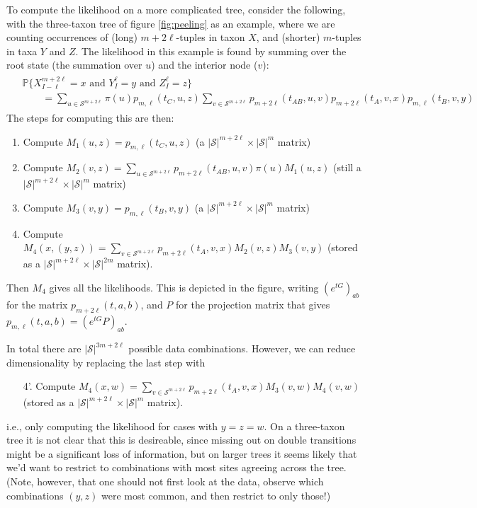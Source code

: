 \documentclass{article}
\renewcommand{\P}{\mathbb{P}}
\newcommand{\calS}{\mathcal{S}}  %
\theoremstyle{plain}
\theoremstyle{definition}
\begin{document}
To compute the likelihood on a more complicated tree, consider the following,
with the three-taxon tree of figure \ref{fig:peeling} as an example,
where we are counting occurrences of (long) $m+2\ell$-tuples in taxon $X$,
and (shorter) $m$-tuples in taxa $Y$ and $Z$.
The likelihood in this example is found by summing over the root state (the summation over $u$)
and the interior node ($v$):
\begin{align} \label{eqn:three_taxa_likelihood}
  \begin{split}
    & \P\{X_{I-\ell}^{m+2\ell}=x \text{ and } Y_I^\ell=y \text{ and } Z_I^\ell=z \} \\
    &\qquad = \sum_{u \in \calS^{m+2\ell}} \pi(u) p_{m,\ell}(t_C,u,z) \sum_{v \in \calS^{m+2\ell}} p_{m+2\ell}(t_{AB},u,v) p_{m+2\ell}(t_{A},v,x) p_{m,\ell}(t_B,v,y)
  \end{split}
\end{align}
The steps for computing this are then:
\begin{enumerate}

  \item Compute $M_1(u,z) = p_{m,\ell}(t_C,u,z)$ (a $|\calS|^{m+2\ell} \times |\calS|^m$ matrix)

  \item Compute $M_2(v,z) = \sum_{u \in \calS^{m+2\ell}}  p_{m+2\ell}(t_{AB},u,v) \pi(u) M_1(u,z)$ (still a $|\calS|^{m+2\ell} \times |\calS|^m$ matrix)

  \item Compute $M_3(v,y) = p_{m,\ell}(t_B,v,y)$ (a $|\calS|^{m+2\ell} \times |\calS|^m$ matrix)

  \item Compute $M_4(x,(y,z)) = \sum_{v \in \calS^{m+2\ell}} p_{m+2\ell}(t_{A},v,x) M_2(v,z) M_3(v,y)$ (stored as a $|\calS|^{m+2\ell} \times |\calS|^{2m}$ matrix).

\end{enumerate}
Then $M_4$ gives all the likelihoods.
This is depicted in the figure, writing $\left(e^{tG}\right)_{ab}$ for the matrix $p_{m+2\ell}(t,a,b)$,
and $P$ for the projection matrix that gives $p_{m,\ell}(t,a,b) = \left( e^{tG} P\right)_{ab}$.


In total there are $|\calS|^{3m+2\ell}$ possible data combinations.
However, we can reduce dimensionality by replacing the last step with
\begin{enumerate}

  \item[4'.] Compute $M_4(x,w) = \sum_{v \in \calS^{m+2\ell}} p_{m+2\ell}(t_{A},v,x) M_3(v,w) M_4(v,w)$ (stored as a $|\calS|^{m+2\ell} \times |\calS|^{m}$ matrix).

\end{enumerate}
i.e., only computing the likelihood for cases with $y=z=w$.
On a three-taxon tree it is not clear that this is desireable, since missing out on double transitions
might be a significant loss of information,
but on larger trees it seems likely that we'd want to restrict to combinations with most sites agreeing across the tree.
(Note, however, that one should not first look at the data, observe which combinations $(y,z)$ were most common, and then restrict to only those!)
\end{document}
